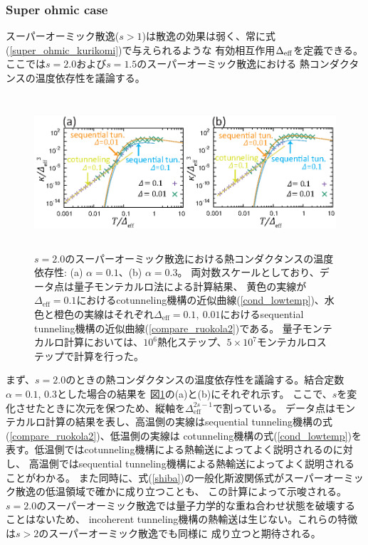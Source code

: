 \subsubsection{Super ohmic case}

スーパーオーミック散逸($s>1$)は散逸の効果は弱く、常に式(\ref{super_ohmic_kurikomi})で与えられるような
有効相互作用$\Delta_{\rm eff}$を定義できる。ここでは$s=2.0$および$s=1.5$のスーパーオーミック散逸における
熱コンダクタンスの温度依存性を議論する。

\begin{figure}[tb]
	\centering
	\includegraphics[height=5.7cm]{conductance_s2.0.eps}
	\caption{
	$s=2.0$のスーパーオーミック散逸における熱コンダクタンスの温度依存性: (a) $\alpha=0.1$、(b) $\alpha=0.3$。
	両対数スケールとしており、データ点は量子モンテカルロ法による計算結果、
	黄色の実線が$\Delta_{\mathrm{eff}}=0.1$におけるcotunneling機構の近似曲線(\ref{cond_lowtemp})、水色と橙色の実線はそれぞれ$\Delta_{\mathrm{eff}}=0.1,\ 0.01$におけるsequential tunneling機構の近似曲線(\ref{compare_ruokola2})である。
		量子モンテカルロ計算においては、$10^6$熱化ステップ、$5\times10^7$モンテカルロステップで計算を行った。
	}
	\label{fig:conductance_s2.0}
\end{figure}

まず、$s=2.0$のときの熱コンダクタンスの温度依存性を議論する。結合定数$\alpha=0.1$, $0.3$とした場合の結果を
図\ref{fig:conductance_s2.0}の(a)と(b)にそれぞれ示す。
ここで、$s$を変化させたときに次元を保つため、縦軸を$\Delta_{\mathrm{eff}}^{2s-1}$で割っている。
データ点はモンテカルロ計算の結果を表し、高温側の実線はsequential tunneling機構の式(\ref{compare_ruokola2})、低温側の実線は
cotunneling機構の式(\ref{cond_lowtemp})を表す。低温側ではcotunneling機構による熱輸送によってよく説明されるのに対し、
高温側ではsequential tunneling機構による熱輸送によってよく説明されることがわかる。
また同時に、式(\ref{shiba})の一般化斯波関係式がスーパーオーミック散逸の低温領域で確かに成り立つことも、
この計算によって示唆される。
$s=2.0$のスーパーオーミック散逸では量子力学的な重ね合わせ状態を破壊することはないため、
incoherent tunneling機構の熱輸送は生じない。これらの特徴は$s>2$のスーパーオーミック散逸でも同様に
成り立つと期待される。

